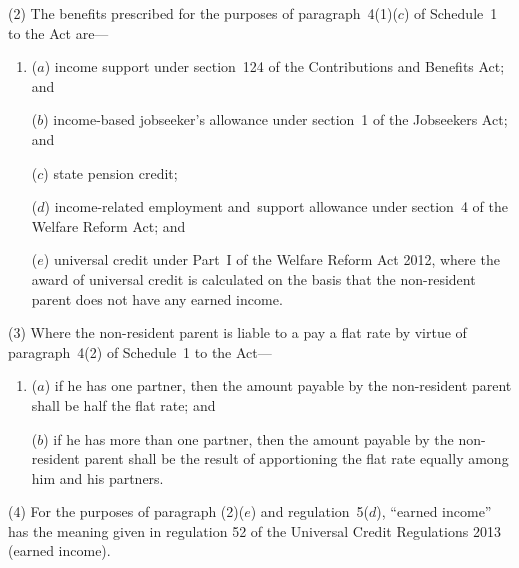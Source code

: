 \documentclass[12pt,a4paper]{article}
\begin{document}
(2) The benefits prescribed for the purposes of paragraph~4(1)($c$)  of Schedule~1 to the Act are—
\begin{enumerate}\item[]
($a$) income support under section~124 of the Contributions and Benefits Act; and

($b$) income-based jobseeker’s allowance under section~1 of the Jobseekers Act;
%
and

    ($c$) 
    state pension credit;
%

($d$) income-related employment and~support allowance under section~4 of the Welfare Reform Act;
%
and

($e$) universal credit under Part~I of the Welfare Reform Act 2012, where the award of universal credit is calculated on the basis that the non-resident parent does not have any earned income.
\end{enumerate}

(3) Where the non-resident parent is liable to a pay a flat rate by virtue of paragraph~4(2) of Schedule~1 to the Act—
\begin{enumerate}\item[]
($a$) if he has one partner, then the amount payable by the non-resident parent shall be half the flat rate; and

($b$) if he has more than one partner, then the amount payable by the non-resident parent shall be the result of apportioning the flat rate equally among him and his partners.
\end{enumerate}

(4) For the purposes of paragraph (2)($e$)  and regulation~5($d$), “earned income” has the meaning given in regulation 52 of the Universal Credit Regulations 2013 (earned income).
\end{document}
